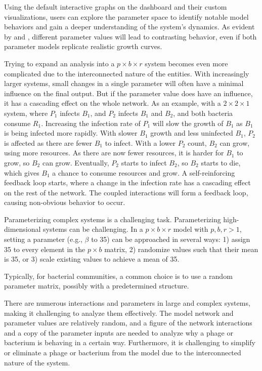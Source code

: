 Using the default interactive graphs on the dashboard and their custom visualizations, users can explore the parameter space to identify notable model behaviors and gain a deeper understanding of the system's dynamics. 
As evident by  and , different parameter values will lead to contrasting behavior, even if both parameter models replicate realistic growth curves. 

Trying to expand an analysis into a $p\times b\times r$ system becomes even more complicated due to the interconnected nature of the entities. 
With increasingly larger systems, small changes in a single parameter will often have a minimal influence on the final output. 
But if the parameter value does have an influence, it has a cascading effect on the whole network. 
As an example, with a $2\times 2\times 1$ system, where $P_1$ infects $B_1$, and $P_2$ infects $B_1$ and $B_2$, and both bacteria consume $R_1$.  
Increasing the infection rate of $P_1$ will slow the growth of $B_1$ as $B_1$ is being infected more rapidly. 
With slower $B_1$ growth and less uninfected $B_1$, $P_2$ is affected as there are fewer $B_1$ to infect. With a lower $P_2$ count, $B_2$ can grow, using more resources. 
As there are now fewer resources, it is harder for $B_1$ to grow, so $B_2$ can grow. 
Eventually, $P_2$ starts to infect $B_2$, so $B_2$ starts to die, which gives $B_1$ a chance to consume resources and grow. 
A self-reinforcing feedback loop starts, where a change in the infection rate has a cascading effect on the rest of the network. 
The coupled interactions will form a feedback loop, causing non-obvious behavior to occur. 

Parameterizing complex systems is a challenging task. 
Parameterizing high-dimensional systems can be challenging. 
In a $p \times b \times r$ model with $p, b, r > 1$, setting a parameter (e.g., $\beta$ to 35) can be approached in several ways: 1) assign 35 to every element in the $p \times b$ matrix, 2) randomize values such that their mean is 35, or 3) scale existing values to achieve a mean of 35.

Typically, for bacterial communities, a common choice is to use a random parameter matrix, possibly with a predetermined structure. 

There are numerous interactions and parameters in large and complex systems, making it challenging to analyze them effectively. 
The model network and parameter values are relatively random, and a figure of the network interactions and a copy of the parameter inputs are needed to analyze why a phage or bacterium is behaving in a certain way. 
Furthermore, it is challenging to simplify or eliminate a phage or bacterium from the model due to the interconnected nature of the system. 

